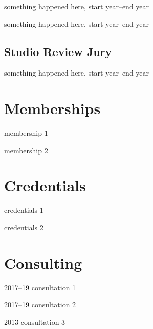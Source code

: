 \documentclass[12pt,letterpaper]{report}
\newcommand{\listitemspace}{0.25em}
\renewenvironment{itemize}
{\begin{list}{}{\setlength{\leftmargin}{0em}
                \setlength{\parskip}{0em}
                \setlength{\itemsep}{\listitemspace}
                \setlength{\parsep}{\listitemspace}}}
{\end{list}}
\begin{document}
    \begin{itemize}

        \item something happened here, start year--end year
        \item something happened here, start year--end year

    \end{itemize}

    \subsection*{Studio Review Jury}

    \begin{itemize}

        \item something happened here, start year--end year

    \end{itemize}



    \section*{Memberships}

    \begin{itemize}

        \item membership 1
        \item membership 2

    \end{itemize}



    \section*{Credentials}

    \begin{itemize}

        \item credentials 1
        \item credentials 2

    \end{itemize}


    \section*{Consulting}

    \begin{tablist}

        \item[2017--19] \tab{}consultation 1
        \item[2017--19] \tab{}consultation 2
        \item[2013]     \tab{}consultation 3

    \end{tablist}
\end{document}
